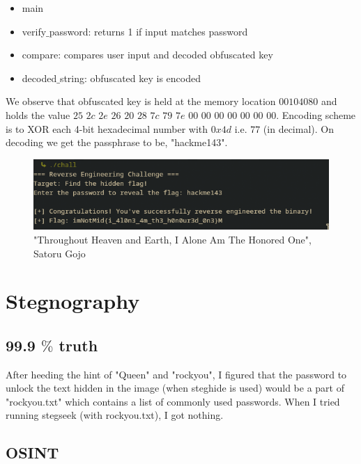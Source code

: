 \documentclass{article}
\begin{document}
\begin{itemize}
    \item main
    \item verify$\_$password: returns 1 if input matches password
    \item compare: compares user input and decoded obfuscated key
    \item decoded$\_$string: obfuscated key is encoded
\end{itemize}
We observe that obfuscated key is held at the memory location $00104080$ and holds the value $25$ $2c$ $2e$ $26$ $20$ $28$ $7c$ $79$ $7e$ $00$ $00$ $00$ $00$ $00$ $00$ $00$. Encoding scheme is to XOR each 4-bit hexadecimal number with $0x4d$ i.e. $77$ (in decimal). On decoding we get the passphrase to be, "hackme143". 
\begin{figure}[h!]
    \centering
    \includegraphics[width=1\linewidth]{figs/jjk4.png}
    \caption{"Throughout Heaven and Earth, I Alone Am The Honored One", Satoru Gojo}
    \label{fig:enter-label}
\end{figure}
\section{Stegnography}
\subsection{99.9 $\%$ truth}
After heeding the hint of "Queen" and "rockyou", I figured that the password to unlock the text hidden in the image (when steghide is used) would be a part of "rockyou.txt" which contains a list of commonly used passwords. When I tried running stegseek (with rockyou.txt), I got nothing.
\subsection{OSINT}
\end{document}
